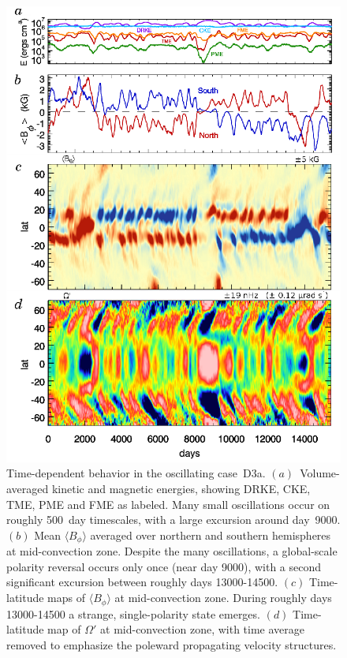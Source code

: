\begin{figure}[!p]
  \begin{center}
    \includegraphics[width=0.8\linewidth]{figs/chapter_8/time_history_mmc_vturf_3_SC.eps}
  \end{center}
  \caption[Time-dependent behavior in the oscillating case~D3a]
	  {Time-dependent behavior in the oscillating case~D3a.  
            $(a)$~Volume-averaged kinetic and magnetic energies, showing DRKE,
	  CKE, TME, PME and FME as labeled.  Many small oscillations
	  occur on roughly 500~day timescales, with a large excursion
	  around day~9000.  
	  $(b)$ Mean $\langle B_\phi \rangle$ averaged over northern
	  and southern hemispheres at mid-convection zone.  Despite
	  the many oscillations, a global-scale polarity reversal occurs
	  only once (near day 9000), with a second significant
	  excursion between roughly days 13000-14500.
	  $(c)$  Time-latitude maps of $\langle B_\phi \rangle$ at
	  mid-convection zone.  During roughly days 13000-14500 a strange,
	  single-polarity state emerges.	  
	  $(d)$ Time-latitude map of $\Omega'$ at mid-convection zone,
	  with time average removed to emphasize the poleward
	  propagating velocity structures. 
	  \label{fig:D3a}}
\end{figure}


